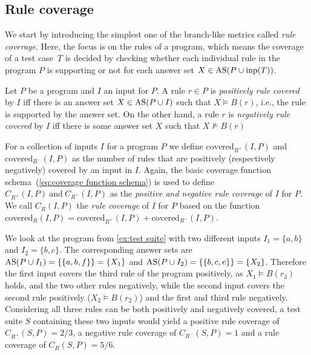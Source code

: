 \subsection{Rule coverage}
\label{subsec:Coverage metrics/Branch-like coverage/Rule coverage}
We start by introducing the simplest one of the branch-like metrics called \emph{rule coverage}. Here, the focus is on the rules of a program, which means the coverage of a test case~$T$ is decided by checking whether each individual rule in the program $P$ is supporting or not for each answer set \(X \in \operatorname{AS}(P \cup \operatorname{inp}(T))\).

\begin{definition}
\label{def:rule coverage}
    Let $P$ be a program and $I$ an input for $P$. A rule \(r \in P\) is \emph{positively rule covered} by $I$ iff there is an answer set \(X \in \operatorname{AS}(P \cup I)\) such that \(X \models B(r)\), i.e., the rule is supported by the answer set.
    On the other hand, a rule $r$ is \emph{negatively rule covered} by $I$ iff there is some answer set $X$ such that \(X \not\models B(r)\)
\end{definition}

For a collection of inputs $I$ for a program $P$ we define \(\text{covered}_{R^+}(I, P)\) and \(\text{covered}_{R^-}(I, P)\) as the number of rules that are positively (respectively negatively) covered by an input in $I$. Again, the basic coverage function schema~(\ref{eq:coverage function schema}) is used to define \(C_{R^+}(I, P)\ \text{and}\ C_{R^-}(I, P)\) as the \emph{positive and negative rule coverage} of $I$ for $P$. We call \(C_R(I, P)\) the \emph{rule coverage} of $I$ for $P$ based on the function \(\text{covered}_{R}(I, P) = \text{covered}_{R^+}(I, P) + \text{covered}_{R^-}(I, P)\).

\begin{example}
\label{ex:rule coverage}
    We look at the program from \cref{ex:test suite} with two different inputs \(I_1 = \{a, b\}\) and \(I_2 = \{b, c\}\). The corresponding answer sets are \(\operatorname{AS}(P \cup I_1) = \{\{a, b, f\}\} = \{X_1\}\) and \(\operatorname{AS}(P \cup I_2) = \{\{b, c, e\}\} = \{X_2\}\). Therefore the first input covers the third rule of the program positively, as \(X_1 \models B(r_3)\) holds, and the two other rules negatively, while the second input covers the second rule positively (\(X_2 \models B(r_2)\)) and the first and third rule negatively. Considering all three rules can be both positively and negatively covered, a test suite $S$ containing these two inputs would yield a positive rule coverage of \(C_{R^+}(S, P) = 2/3\), a negative rule coverage of \(C_{R^-}(S, P) = 1\) and a rule coverage of \(C_R(S, P) = 5/6\).
\end{example}

